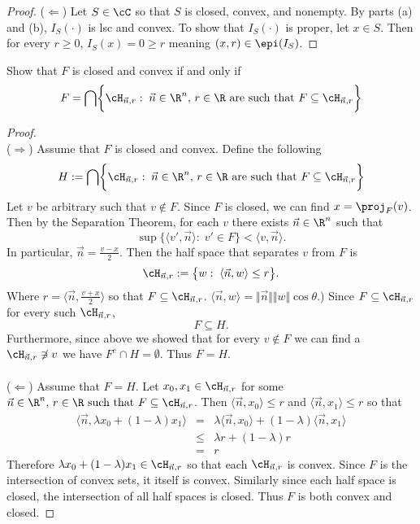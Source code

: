 \documentclass[12pt]{article}
\begin{document}
\begin{itemize}
\begin{proof}
($\Leftarrow$) Let $S\in\cC$ so that $S$ is closed, convex, and nonempty. By parts (a) and (b), $I_S(\cdot)$ is lsc and convex. 
To show that $I_S(\cdot)$ is proper, let $x\in S$. Then for every $r\geq0$, $I_S(x)=0\geq r$ meaning $(x,r)\in\epi(I_S)$.
\end{proof}
\end{itemize}

{\blue
\begin{exer}
Show that $F$ is closed and convex if and only if
\[
F=\bigcap\biggl\{\cH_{\vec{n},r}:\;\vec{n}\in\R^n,\,r\in\R\text{  are such that } F\subseteq \cH_{\vec{n},r} \biggr\}
\]
\end{exer}}

\begin{proof} \quad\\
($\Rightarrow$) 
Assume that $F$ is closed and convex. Define the following 
\[
H := \bigcap\biggl\{\cH_{\vec{n},r}:\;\vec{n}\in\R^n,\,r\in\R\text{  are such that } F\subseteq \cH_{\vec{n},r} \biggr\}
\]
Let $v$ be arbitrary such that $v\not\in F$. 
Since $F$ is closed, we can find $x=\proj_F(v)$.
Then by the Separation Theorem, for each $v$ there exists $\vec n\in\R^n$ such that 
\begin{equation*}
	\sup\bigl\{\langle v',\vec n\rangle:\; v'\in F\bigr\} < \langle v,\vec n\rangle.
\end{equation*}
In particular, $\vec n = \frac{v-x}{2}$.
Then the half space that separates $v$ from $F$ is 
\[
\cH_{\vec{n},r}:=\bigl\{w :\;\langle\vec{n},w\rangle\leq r\bigr\}.
\]
Where $r=\langle\vec{n},\frac{v+x}{2}\rangle$ so that $F\subseteq\cH_{\vec{n},r}$.
$\langle\vec{n},w\rangle = \Vert\vec{n}\Vert\Vert w\Vert\cos\theta$.)
Since $F\subseteq\cH_{\vec{n},r}$ for every such $\cH_{\vec{n},r}$,
$$F\subseteq H.$$
Furthermore, since above we showed that for every $v\not\in F$ we can find a $\cH_{\vec{n},r}\not\ni v$ we have 
$F^c\cap H=\emptyset.$
Thus $F=H$.\\\\
($\Leftarrow$) 
Assume that $F = H$. 
Let $x_0,x_1\in \cH_{\vec{n},r}$ for some $\vec{n}\in\R^n,\,r\in\R\text{  such that } F\subseteq \cH_{\vec{n},r}$. 
Then $\langle\vec{n}, x_0\rangle\leq r$ and $\langle\vec{n},x_1\rangle\leq r$ so that
\begin{eqnarray*}
\langle\vec{n},\lambda x_0+(1-\lambda)x_1\rangle &=& \lambda\langle\vec{n}, x_0\rangle+(1-\lambda)\langle\vec{n},x_1\rangle \\
	&\leq& \lambda r+(1-\lambda)r \\
	&=& r
\end{eqnarray*}
Therefore $\lambda x_0+(1-\lambda)x_1\in  \cH_{\vec{n},r}$ so that each $ \cH_{\vec{n},r}$ is convex. 
Since $F$ is the intersection of convex sets, it itself is convex.
Similarly since each half space is closed, the intersection of all half spaces is closed.  Thus $F$ is both convex and closed.

\end{proof}
\end{document}
